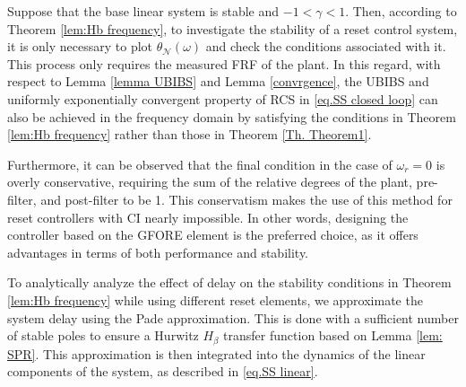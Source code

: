 Suppose that the base linear system is stable and $-1 < \gamma < 1$. Then, according to Theorem \ref{lem:Hb frequency}, to investigate the stability of a reset control system, it is only necessary to plot $\theta_{\mathcal{N}}(\omega)$ and check the conditions associated with it. This process only requires the measured FRF of the plant. In this regard, with respect to Lemma \ref{lemma UBIBS} and Lemma \ref{convrgence}, the UBIBS and uniformly exponentially convergent property of RCS in \eqref{eq.SS closed loop} can also be achieved in the frequency domain by satisfying the conditions in Theorem \ref{lem:Hb frequency} rather than those in Theorem \ref{Th. Theorem1}.

Furthermore, it can be observed that the final condition in the case of $\omega_r=0$ is overly conservative, requiring the sum of the relative degrees of the plant, pre-filter, and post-filter to be 1. This conservatism makes the use of this method for reset controllers with CI nearly impossible. In other words, designing the controller based on the GFORE element is the preferred choice, as it offers advantages in terms of both performance \cite{LukeIFAC2024} and stability.\\

\begin{comment}
\begin{remark}
    \label{delay_exp}
According to Lemma \ref{lem: SPR}, demonstrating the SPRness of the $H_\beta$ transfer function for a system with delay is not feasible. Hence, in this study, we approximate the system delay using the Pade approximation with a sufficient number of stable poles. This approximation is then integrated into the dynamics of the system's linear components, as described in \eqref{eq.SS linear}.
\end{remark}
\end{comment}
\begin{remark}
    \label{delay_exp}
To analytically analyze the effect of delay on the stability conditions in Theorem \ref{lem:Hb frequency} while using different reset elements, we approximate the system delay using the Pade approximation. This is done with a sufficient number of stable poles to ensure a Hurwitz $H_\beta$ transfer function based on Lemma \ref{lem: SPR}. This approximation is then integrated into the dynamics of the linear components of the system, as described in \eqref{eq.SS linear}.
\end{remark}